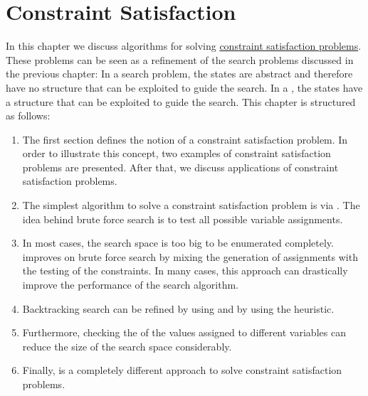 \chapter{Constraint Satisfaction}
In this chapter we discuss algorithms for solving 
\href{https://en.wikipedia.org/wiki/Constraint_satisfaction_problem}{constraint satisfaction problems}.
These problems can be seen as a refinement of the search problems discussed in the previous chapter:  In a
search problem, the states are abstract and therefore have no structure that can be exploited to guide the
search.  In a , the states have a structure that can be exploited to
guide the search.  This chapter is structured as follows:
\begin{enumerate}
\item The first section defines the notion of a constraint satisfaction problem.  In order to illustrate this
      concept, two examples of constraint satisfaction problems are presented.  After that, we discuss
      applications of constraint satisfaction problems.
\item The simplest algorithm to solve a constraint satisfaction problem is via .
      The idea behind brute force search is to test all possible variable assignments.
\item In most cases, the search space is too big to be enumerated completely.
       improves on brute force search by mixing the generation
      of assignments with the testing of the constraints.  In many cases, this approach can
      drastically improve the performance of the search algorithm.
\item Backtracking search can be refined by using  and by
      using the  heuristic.
\item Furthermore, checking the  of the values assigned to different variables
      can reduce the size of the search space considerably. 
\item Finally,  is a completely different approach to solve
      constraint satisfaction problems.
\end{enumerate}

